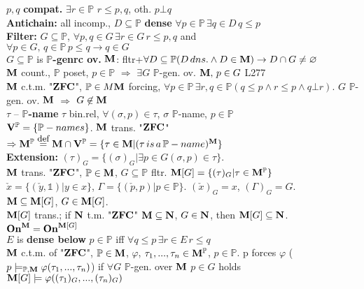 \documentclass[9pt]{article}
\newcommand{\class}[1]{{\bf #1}}
\newcommand{\Pp}{\mathbb{P}}
\newcommand{\eqdef}{\overset{\mbox{\small{def}}}{=}}
\newcommand{\On}{\class{On}}
\newcommand{\V}{\class{V}}
\begin{document}
\begin{multicols*}{2}
$p,q$ {\bf compat.} $\exists r\in \Pp$ $r\leqslant p, q$, oth. $p\bot q$\\
{\bf Antichain:} all incomp., $D\subseteq \Pp$ {\bf dense} $\forall p\in\Pp\,\exists q\in D\, q\leqslant p$\\
{\bf Filter:} $G\subseteq \Pp$, $\forall p, q\in G\,\exists r\in G\, r\leqslant p, q$ and\\ $\forall p\in G,\,q\in \Pp\,p\leqslant q\rightarrow q\in G$\\
$G\subseteq \Pp$ is {\bf $\Pp$-genrc ov.} $\class{M}$: fltr+$\forall D\subseteq \Pp (D\,dns.\wedge D\in\class{M})\rightarrow D\cap G\neq \varnothing$\\
$\class{M}$ count., $\Pp$ poset, $p\in \Pp$ $\Rightarrow$ $\exists G$ $\Pp$-gen. ov. $\class{M},\,p\in G$ L277\\
$\class{M}$ c.t.m. "$\class{ZFC}$", $\Pp\in M\class{M}$ forcing, $\forall p\in\Pp\,\exists r,q\in\Pp (q\leqslant p\wedge r\leqslant p\wedge q\bot r)$. $G$ $\Pp$-gen. ov. $\class{M}$ $\Rightarrow$ $G\not\in\class{M}$\\
$\tau$ -- {\bf $\Pp$-name} $\tau$ bin.rel, $\forall (\sigma,p)\in\tau$, $\sigma$ $\Pp$-name, $p\in\Pp$\\
$\V^\Pp=\{\Pp-names\}$. $\class{M}$ trans. "$\class{ZFC}$" $\Rightarrow \class{M}^\Pp\eqdef \class{M}\cap\V^\Pp=\{\tau\in\class{M}|(\tau\,is\,a\,\Pp-name)^\class{M}\}$\\
{\bf Extension:} $(\tau)_G=\{(\sigma)_G|\exists p\in G(\sigma,p)\in\tau\}$.\\
$\class{M}$ trans. "$\class{ZFC}$", $\Pp\in\class{M}$, $G\subseteq \Pp$ fltr. $\class{M}[G]=\{(\tau)_G|\tau\in\class{M}^\Pp\}$\\
$\check{x}=\{(\check{y},\mathbb{1})|y\in x\}$, $\Gamma=\{(\check{p},p)|p\in\Pp\}$. $(\check{x})_G=x$, $(\Gamma)_G=G$.\\
$\class{M}\subseteq\class{M}[G]$, $G\in\class{M}[G]$.\\
$\class{M}[G]$ trans.; if $\class{N}$ t.m. "$\class{ZFC}$" $\class{M}\subseteq\class{N}$, $G\in\class{N}$, then $\class{M}[G]\subseteq \class{N}$. $\On^\class{M}=\On^{\class{M}[G]}$\\
$E$ is {\bf dense below} $p\in\Pp$ iff $\forall q\leqslant p\,\exists r\in E\,r\leqslant q$\\
$\class{M}$ c.t.m. of "$\class{ZFC}$", $\Pp\in\class{M}$, $\varphi$, $\tau_1,...,\tau_n\in\class{M}^\Pp$, $p\in\Pp$. p forces $\varphi$ ($p\models_{\Pp,\class{M}}\varphi(\tau_1,...,\tau_n)$) if $\forall G$ $\Pp$-gen. over $\class{M}$ $p\in G$ holds $\class{M}[G]\models\varphi((\tau_1)_G,...,(\tau_n)_G)$\\

\end{multicols*}
\end{document}
